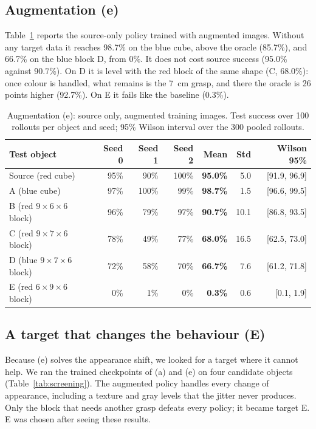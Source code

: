 \documentclass{article}
\begin{document}
\subsection{Augmentation (e)}
Table~\ref{tab:augment} reports the source-only policy trained with augmented images.
Without any target data it reaches 98.7\% on the blue cube, above the oracle (85.7\%), and
66.7\% on the blue block D, from 0\%. It does not cost source success (95.0\% against
90.7\%). On D it is level with the red block of the same shape (C, 68.0\%): once colour
is handled, what remains is the 7~cm grasp, and there the oracle is 26 points higher
(92.7\%). On E it fails like the baseline (0.3\%).

\begin{table}[t]
  \caption{Augmentation (e): source only, augmented training images. Test success over 100
  rollouts per object and seed; 95\% Wilson interval over the 300 pooled rollouts.}
  \label{tab:augment}
  \centering
  \small
  \begin{tabular}{@{}lrrrrrr@{}}
    \toprule
    Test object & Seed 0 & Seed 1 & Seed 2 & Mean & Std & Wilson 95\% \\
    \midrule
    Source (red cube) & 95\% & 90\% & 100\% & \textbf{95.0\%} & 5.0 & [91.9, 96.9] \\
    A (blue cube) & 97\% & 100\% & 99\% & \textbf{98.7\%} & 1.5 & [96.6, 99.5] \\
    B (red $9 \times 6 \times 6$ block) & 96\% & 79\% & 97\% & \textbf{90.7\%} & 10.1 & [86.8, 93.5] \\
    C (red $9 \times 7 \times 6$ block) & 78\% & 49\% & 77\% & \textbf{68.0\%} & 16.5 & [62.5, 73.0] \\
    D (blue $9 \times 7 \times 6$ block) & 72\% & 58\% & 70\% & \textbf{66.7\%} & 7.6 & [61.2, 71.8] \\
    E (red $6 \times 9 \times 6$ block) & 0\% & 1\% & 0\% & \textbf{0.3\%} & 0.6 & [0.1, 1.9] \\
    \bottomrule
  \end{tabular}
\end{table}

\subsection{A target that changes the behaviour (E)}
\label{sec:targetE}
Because (e) solves the appearance shift, we looked for a target where it cannot help. We
ran the trained checkpoints of (a) and (e) on four candidate objects
(Table~\ref{tab:screening}). The augmented policy handles every change of appearance,
including a texture and gray levels that the jitter never produces. Only the block that
needs another grasp defeats every policy; it became target E. E was chosen after seeing
these results.
\end{document}
